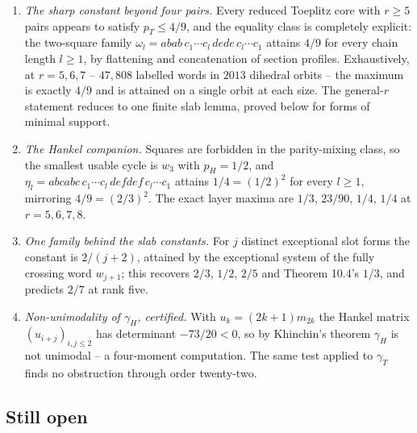 \begin{enumerate}
\item[(1)] \emph{The sharp constant beyond four pairs.}  Every reduced
Toeplitz core with $r\ge5$ pairs appears to satisfy $p_T\le4/9$, and the
equality class is completely explicit: the two-square family
$\omega_l=abab\,c_1\cdots c_l\,dede\,c_l\cdots c_1$ attains $4/9$ for
every chain length $l\ge1$, by flattening and concatenation of section
profiles.  Exhaustively, at $r=5,6,7$ -- $47{,}808$ labelled words in
$2013$ dihedral orbits -- the maximum is exactly $4/9$ and is attained
on a single orbit at each size.  The general-$r$ statement reduces to
one finite slab lemma, proved below for forms of minimal support.

\item[(2)] \emph{The Hankel companion.}  Squares are forbidden in the
parity-mixing class, so the smallest usable cycle is $w_3$ with
$p_H=1/2$, and $\eta_l=abcabc\,c_1\cdots c_l\,defdef\,c_l\cdots c_1$
attains $1/4=(1/2)^2$ for every $l\ge1$, mirroring $4/9=(2/3)^2$.  The
exact layer maxima are $1/3$, $23/90$, $1/4$, $1/4$ at $r=5,6,7,8$.

\item[(3)] \emph{One family behind the slab constants.}  For $j$ distinct
exceptional slot forms the constant is $2/(j+2)$, attained by the
exceptional system of the fully crossing word $w_{j+1}$; this recovers
$2/3$, $1/2$, $2/5$ and Theorem 10.4's $1/3$, and predicts $2/7$ at rank
five.

\item[(4)] \emph{Non-unimodality of $\gamma_H$, certified.}  With
$u_k=(2k+1)m_{2k}$ the Hankel matrix $(u_{i+j})_{i,j\le2}$ has
determinant $-73/20<0$, so by Khinchin's theorem $\gamma_H$ is not
unimodal -- a four-moment computation.  The same test applied to
$\gamma_T$ finds no obstruction through order twenty-two.
\end{enumerate}

\subsection*{Still open}


